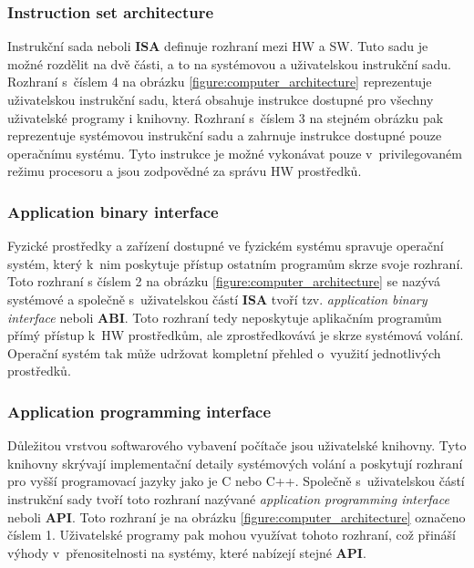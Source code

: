 \subsubsection{Instruction set architecture}
\label{chapter:virtualization:virtual_machine:computer_architecture:isa}
Instrukční sada neboli \textbf{ISA} definuje rozhraní mezi HW a SW. Tuto sadu je možné rozdělit na dvě části, a to na systémovou a
uživatelskou instrukční sadu. Rozhraní s~číslem 4 na obrázku \ref{figure:computer_architecture} reprezentuje uživatelskou
instrukční sadu, která obsahuje instrukce dostupné pro všechny uživatelské programy i knihovny. Rozhraní s~číslem 3 na stejném
obrázku pak reprezentuje systémovou instrukční sadu a zahrnuje instrukce dostupné pouze operačnímu systému. Tyto instrukce je
možné vykonávat pouze v~privilegovaném režimu procesoru a jsou zodpovědné za správu HW prostředků.
\subsubsection{Application binary interface}
\label{chapter:virtualization:virtual_machine:computer_architecture:abi}
Fyzické prostředky a zařízení dostupné ve fyzickém systému spravuje operační systém, který k~nim poskytuje přístup ostatním
programům skrze svoje rozhraní. Toto rozhraní s číslem 2 na obrázku \ref{figure:computer_architecture} se nazývá systémové
a společně s~uživatelskou částí \textbf{ISA} tvoří tzv. \textit{application binary interface} neboli \textbf{ABI}. Toto rozhraní
tedy neposkytuje aplikačním programům přímý přístup k~HW prostředkům, ale zprostředkovává je skrze systémová volání. Operační
systém tak může udržovat kompletní přehled o~využití jednotlivých prostředků.
\subsubsection{Application programming interface}
\label{chapter:virtualization:virtual_machine:computer_architecture:api}
Důležitou vrstvou softwarového vybavení počítače jsou uživatelské knihovny. Tyto knihovny skrývají implementační detaily
systémových volání a poskytují rozhraní pro vyšší programovací jazyky jako je C nebo C++. Společně s~uživatelskou
částí instrukční sady tvoří toto rozhraní nazývané \textit{application programming interface} neboli \textbf{API}.
Toto rozhraní je na obrázku \ref{figure:computer_architecture} označeno číslem  1. Uživatelské programy pak mohou využívat
tohoto rozhraní, což přináší výhody v~přenositelnosti na systémy, které nabízejí stejné \textbf{API}.
